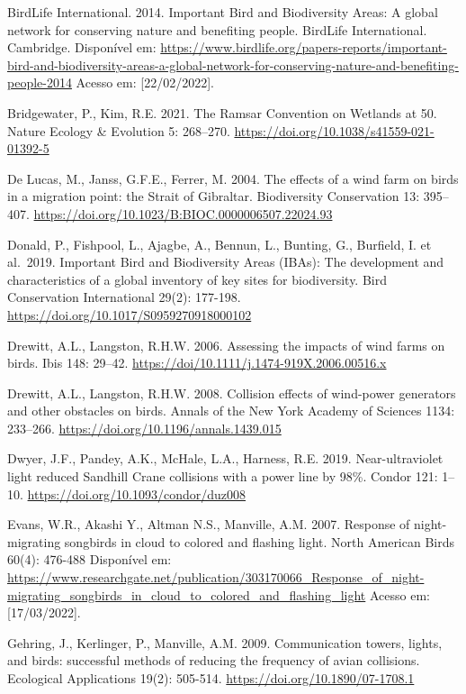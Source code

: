 \documentclass[
  oneside]{scrbook}
\begin{document}
BirdLife International. 2014. Important Bird and Biodiversity Areas: A global network for conserving nature and benefiting people. BirdLife International. Cambridge. Disponível em: \url{https://www.birdlife.org/papers-reports/important-bird-and-biodiversity-areas-a-global-network-for-conserving-nature-and-benefiting-people-2014} Acesso em: {[}22/02/2022{]}.

Bridgewater, P., Kim, R.E. 2021. The Ramsar Convention on Wetlands at 50. Nature Ecology \& Evolution 5: 268--270. \url{https://doi.org/10.1038/s41559-021-01392-5}

De Lucas, M., Janss, G.F.E., Ferrer, M. 2004. The effects of a wind farm on birds in a migration point: the Strait of Gibraltar. Biodiversity Conservation 13: 395--407. \url{https://doi.org/10.1023/B:BIOC.0000006507.22024.93}

Donald, P., Fishpool, L., Ajagbe, A., Bennun, L., Bunting, G., Burfield, I. et al.~2019. Important Bird and Biodiversity Areas (IBAs): The development and characteristics of a global inventory of key sites for biodiversity. Bird Conservation International 29(2): 177-198. \url{https://doi.org/10.1017/S0959270918000102}

Drewitt, A.L., Langston, R.H.W. 2006. Assessing the impacts of wind farms on birds. Ibis 148: 29--42. \url{https://doi/10.1111/j.1474-919X.2006.00516.x}

Drewitt, A.L., Langston, R.H.W. 2008. Collision effects of wind-power generators and other obstacles on birds. Annals of the New York Academy of Sciences 1134: 233--266. \url{https://doi.org/10.1196/annals.1439.015}

Dwyer, J.F., Pandey, A.K., McHale, L.A., Harness, R.E. 2019. Near-ultraviolet light reduced Sandhill Crane collisions with a power line by 98\%. Condor 121: 1--10. \url{https://doi.org/10.1093/condor/duz008}

Evans, W.R., Akashi Y., Altman N.S., Manville, A.M. 2007. Response of night-migrating songbirds in cloud to colored and flashing light. North American Birds 60(4): 476-488 Disponível em: \url{https://www.researchgate.net/publication/303170066_Response_of_night-migrating_songbirds_in_cloud_to_colored_and_flashing_light} Acesso em: {[}17/03/2022{]}.

Gehring, J., Kerlinger, P., Manville, A.M. 2009. Communication towers, lights, and birds: successful methods of reducing the frequency of avian collisions. Ecological Applications 19(2): 505-514. \url{https://doi.org/10.1890/07-1708.1}
\end{document}
